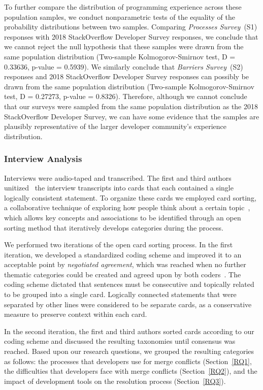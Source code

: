 To further compare the distribution of programming experience across these population samples, we conduct nonparametric tests of the equality of the probability distributions between two samples.
Comparing \textit{Processes Survey}~(S1) responses with 2018 StackOverflow Developer Survey responses, we conclude that we cannot reject the null hypothesis that these samples were drawn from the same population distribution (Two-sample Kolmogorov-Smirnov test, D = 0.33636, p-value = 0.5939).
We similarly conclude that \textit{Barriers Survey}~(S2) responses and 2018 StackOverflow Developer Survey responses can possibly be drawn from the same population distribution (Two-sample Kolmogorov-Smirnov test, D = 0.27273, p-value = 0.8326).
Therefore, although we cannot conclude that our surveys were sampled from the same population distribution as the 2018 StackOverflow Developer Survey, we can have some evidence that the samples are plausibly representative of the larger developer community's experience distribution.

\subsubsection{Interview Analysis}

Interviews were audio-taped and transcribed. 
The first and third authors unitized~\cite{unitization} the interview transcripts into cards that each contained a single logically consistent statement. 
To organize these cards we employed card sorting, a collaborative technique of exploring how people think about a certain topic~\cite{spencer2009card}\cite{card_sort}, which allows key concepts and associations to be identified through an open sorting method that iteratively develops categories during the process.

We performed two iterations of the open card sorting process.
In the first iteration, we developed a standardized coding scheme and improved it to an acceptable point by \textit{negotiated agreement}, which was reached when no further thematic categories could be created and agreed upon by both coders~\cite{garrison2006revisiting}\cite{ritchie2013qualitative}.
The coding scheme dictated that sentences must be consecutive and topically related to be grouped into a single card.
Logically connected statements that were separated by other lines were considered to be separate cards, as a conservative measure to preserve context within each card.

In the second iteration, the first and third authors sorted cards according to our coding scheme and discussed the resulting taxonomies until consensus was reached.
Based upon our research questions, we grouped the resulting categories as follows: the processes that developers use for merge conflicts (Section~\ref{RQ1}, the difficulties that developers face with merge conflicts (Section~\ref{RQ2}), and the impact of development tools on the resolution process (Section~\ref{RQ3}).

